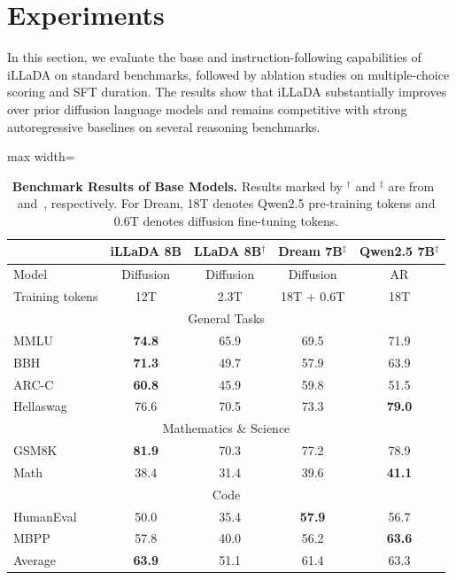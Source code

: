 \documentclass{llmxive}
\begin{document}
\section{Experiments}
\label{sec:experiments}

In this section, we evaluate the base and instruction-following capabilities of iLLaDA on standard benchmarks, followed by ablation studies on multiple-choice scoring and SFT duration. The results show that iLLaDA substantially improves over prior diffusion language models and remains competitive with strong autoregressive baselines on several reasoning benchmarks.

\begin{table}[t!]
    \centering
    \begin{adjustbox}{max width=\textwidth}
    \begin{tabular}{l|cccc}
      \toprule
          & iLLaDA 8B & LLaDA 8B$^{\dagger}$ & Dream 7B$^{\ddagger}$ & Qwen2.5 7B$^{\ddagger}$ \\
      \midrule
      Model & Diffusion & Diffusion & Diffusion & AR \\
      Training tokens & 12T & 2.3T & 18T + 0.6T & 18T \\
      \midrule
      \multicolumn{5}{c}{General Tasks}\\
      \midrule
      MMLU & \textbf{74.8} & 65.9 & 69.5 & 71.9 \\
      BBH & \textbf{71.3} & 49.7 & 57.9 & 63.9 \\
      ARC-C & \textbf{60.8} & 45.9 & 59.8 & 51.5 \\
      Hellaswag & 76.6 & 70.5 & 73.3 & \textbf{79.0} \\
      \midrule
      \multicolumn{5}{c}{Mathematics \& Science}\\
      \midrule
      GSM8K & \textbf{81.9} & 70.3 & 77.2 & 78.9 \\
      Math & 38.4 & 31.4 & 39.6 & \textbf{41.1} \\
      \midrule
      \multicolumn{5}{c}{Code} \\
      \midrule
      HumanEval & 50.0 & 35.4 & \textbf{57.9} & 56.7 \\
      MBPP & 57.8 & 40.0 & 56.2 & \textbf{63.6} \\
      \midrule
      Average & \textbf{63.9} & 51.1 & 61.4 & 63.3 \\
      \bottomrule
    \end{tabular}
    \end{adjustbox}
\caption{\textbf{Benchmark Results of Base Models.} Results marked by $^{\dagger}$ and $^{\ddagger}$ are from~\citet{nie2026large} and~\citet{ye2025dream}, respectively. For Dream, 18T denotes Qwen2.5 pre-training tokens and 0.6T denotes diffusion fine-tuning tokens.}
\label{tab:base}
\end{table}
\end{document}
